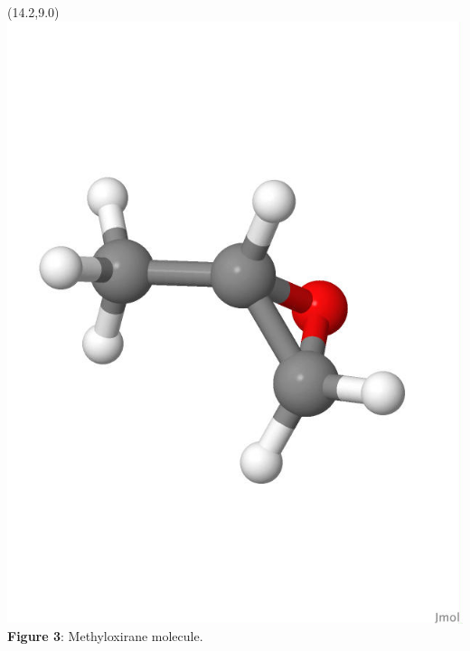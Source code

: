\documentclass[a0,portrait]{a0poster}
\begin{document}
\begin{textblock}{3.0}(14.2,9.0)
    \includegraphics[scale=0.60, viewport = 0 180 550 650, clip]{figures/methyloxirane_white.jpg}
    \footnotesize
    \centering
    \\\textbf{Figure 3}: Methyloxirane molecule.
\end{textblock} 
\end{document}
